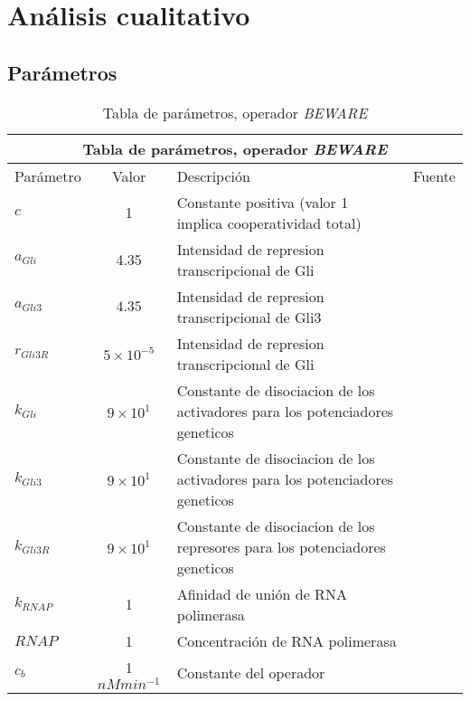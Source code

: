 \chapter{Análisis cualitativo}

\label{ch:simulation}

\section{Parámetros}
\begin{table}[h]
\begin{center}

\begin{tabular}{ |p{3cm}||c|p{3cm}|p{3cm}|  }
	\hline
	\multicolumn{4}{|c|}{Tabla de parámetros, operador \textit{BEWARE}} \\
	\hline
	Parámetro & Valor & Descripción & Fuente\\
	\hline
	$c $  & 1    &\tiny{Constante positiva (valor 1 implica cooperatividad total)} &   \cite{cambon1}\\
	$a_{Gli}$ &   4.35  & \tiny{Intensidad de represion transcripcional de Gli}   & \cite{cambon1}\\
	$a_{Gli3} $ & $4.35$ & \tiny{ Intensidad de represion transcripcional de Gli3 } &  \cite{cambon1}\\
	$r_{Gli3R}$   &$5\times10^{-5}$ & \tiny{ Intensidad de represion transcripcional de Gli } &  \cite{cambon1}\\
	$k_{Gli}$ &  $9\times10^{1}$  & \tiny{ Constante de disociacion de los activadores para los potenciadores geneticos } & \cite{cambon1}\\
	$k_{Gli3}$ & $9\times10^{1}$  & \tiny{ Constante de disociacion de los activadores para los potenciadores geneticos }   & \cite{cambon1}\\
	$k_{Gli3R}$ & $9\times10^{1}$ & \tiny{ Constante de disociacion de los represores para los potenciadores geneticos }   & \cite{cambon1}\\
	
	$k_{RNAP}$& 1  &  \tiny{Afinidad de unión   de RNA polimerasa} & \cite{cambon1}\\
	$RNAP$& 1  & \tiny{Concentración de RNA polimerasa} & \cite{cambon1}\\
	$c_b$& 1 $ nMmin^{-1}$  & \tiny{ Constante del operador} & \cite{cambon1}\\
	\hline
\end{tabular}

\end{center}
\caption{Tabla de parámetros, operador \textit{BEWARE}}\label{beware_params}
\end{table}

